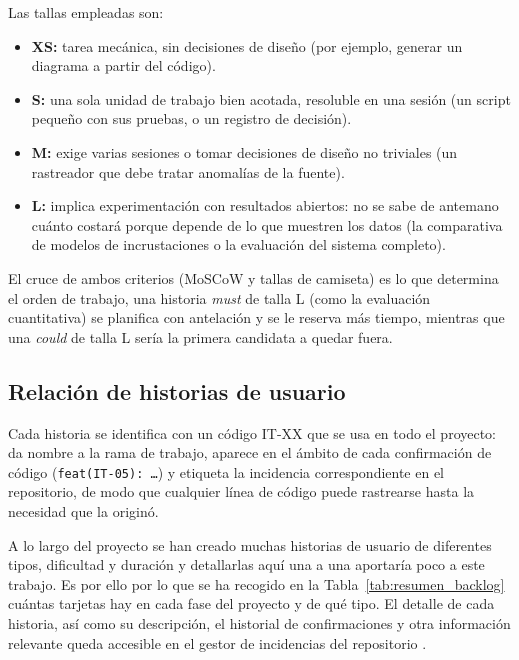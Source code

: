 Las tallas empleadas son:

\begin{itemize}                                                                                                                                                    
  \item \textbf{XS:} tarea mecánica, sin decisiones de diseño (por ejemplo,
        generar un diagrama a partir del código).
  \item \textbf{S:} una sola unidad de trabajo bien acotada, resoluble en una
        sesión (un script pequeño con sus pruebas, o un registro de decisión).
  \item \textbf{M:} exige varias sesiones o tomar decisiones de diseño no
        triviales (un rastreador que debe tratar anomalías de la fuente).
  \item \textbf{L:} implica experimentación con resultados abiertos: no se
        sabe de antemano cuánto costará porque depende de lo que muestren los datos
        (la comparativa de modelos de incrustaciones o la evaluación del sistema
        completo).
\end{itemize}

El cruce de ambos criterios (MoSCoW y tallas de camiseta) es lo que determina el orden de trabajo, una historia
\textit{must} de talla L (como la evaluación cuantitativa) se planifica con
antelación y se le reserva más tiempo, mientras que una \textit{could} de talla L
sería la primera candidata a quedar fuera.

\subsection{Relación de historias de usuario}

Cada historia se identifica con un código IT-XX que se usa en todo el proyecto: da nombre a la rama de trabajo, aparece en el ámbito de cada confirmación de código (\texttt{feat(IT-05): \ldots}) y etiqueta
la incidencia correspondiente en el repositorio, de modo que cualquier línea de código puede rastrearse hasta la necesidad que la originó.

A lo largo del proyecto se han creado muchas historias de usuario de diferentes tipos, dificultad y duración y detallarlas aquí una a una aportaría poco a este trabajo. Es por ello por lo que se ha recogido en la Tabla~\ref{tab:resumen_backlog} cuántas tarjetas hay en cada fase del proyecto y de qué tipo. El detalle de cada historia, así como su descripción, el historial de confirmaciones y otra información relevante queda accesible en el gestor de incidencias del repositorio \cite{repo_tfg}.


